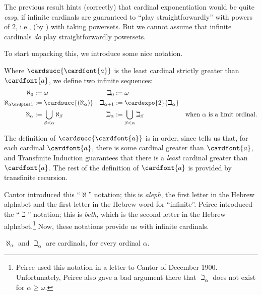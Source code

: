 \documentclass[../../../include/open-logic-section]{subfiles}
\begin{document}


The previous result hints (correctly) that cardinal exponentiation
would be quite \emph{easy}, if infinite cardinals are guaranteed to
``play straightforwardly'' with powers of $2$, i.e., (by
) with taking powersets. But we
cannot assume that infinite cardinals \emph{do} play straightforwardly 
powersets. 

To start unpacking this, we introduce some nice notation.

\begin{defn}
Where $\cardsucc{\cardfont{a}}$ is the least cardinal strictly greater
than $\cardfont{a}$, we define two infinite sequences:
\begin{align*}
	\aleph_{0} &:= \omega & 		
	\beth_{0} &:= \omega\\
	\aleph_{\alpha \ordplus 1} &:= \cardsucc{(\aleph_{\alpha})} &
	\beth_{\alpha+1} &:= \cardexpo{2}{\beth_{\alpha}}\\
	\aleph_{\alpha} &:= \bigcup_{\beta< \alpha} \aleph_{\beta} &
	\beth_{\alpha} &:= \bigcup_{\beta < \alpha}\beth_{\beta} & \text{when $\alpha$ is a limit ordinal}.
	\end{align*}
\end{defn}

The definition of $\cardsucc{\cardfont{a}}$ is in order, since
 tells us that, for each
cardinal $\cardfont{a}$, there is some cardinal greater than
$\cardfont{a}$, and Transfinite Induction guarantees that there is a
\emph{least} cardinal greater than $\cardfont{a}$. The rest of the
definition of $\cardfont{a}$ is provided by transfinite recursion. 

Cantor introduced this ``$\aleph$'' notation; this is \emph{aleph},
the first letter in the Hebrew alphabet and the first letter in the
Hebrew word for ``infinite''. Peirce introduced the ``$\beth$''
notation; this is \emph{beth}, which is the second letter in the
Hebrew alphabet.\footnote{Peirce used this notation in a letter to
Cantor of December 1900. Unfortunately, Peirce also gave a bad
argument there that $\beth_\alpha$ does not exist for $\alpha \geq
\omega$.} Now, these notations provide us with infinite cardinals.

\begin{prop}
$\aleph_\alpha$ and $\beth_\alpha$ are cardinals, for every
ordinal $\alpha$. 
\end{prop}
\end{document}
